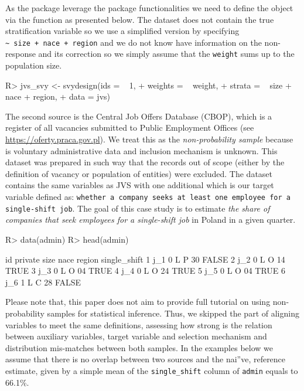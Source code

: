 \documentclass[
]{jss}
\begin{document}
As the package leverage the  package functionalities we need
to define the  object via the  function
as presented below. The dataset does not contain the true stratification
variable so we use a simplified version by specifying
\texttt{\textasciitilde{}\ size\ +\ nace\ +\ region} and we do not know
have information on the non-response and its correction so we simply
assume that the \texttt{weight} sums up to the population size.

\begin{CodeChunk}
\begin{CodeInput}
R> jvs_svy <- svydesign(ids = ~ 1, 
+                      weights = ~ weight,
+                      strata = ~ size + nace + region,
+                      data = jvs)
\end{CodeInput}
\end{CodeChunk}

The second source is the Central Job Offers Database (CBOP), which is a
register of all vacancies submitted to Public Employment Offices (see
\url{https://oferty.praca.gov.pl}). We treat this as the
\textit{non-probability sample} because is voluntary administrative data
and inclusion mechanism is unknown. This dataset was prepared in such
way that the records out of scope (either by the definition of vacancy
or population of entities) were excluded. The dataset contains the same
variables as JVS with one additional  which is our
target variable defined as:
\texttt{whether a company seeks at least one employee for a single-shift job}.
The goal of this case study is to estimate
\textit{the share of companies that seek employees for a single-shift job}
in Poland in a given quarter.

\begin{CodeChunk}
\begin{CodeInput}
R> data(admin)
R> head(admin)
\end{CodeInput}
\begin{CodeOutput}
   id private size nace region single_shift
1 j_1       0    L    P     30        FALSE
2 j_2       0    L    O     14         TRUE
3 j_3       0    L    O     04         TRUE
4 j_4       0    L    O     24         TRUE
5 j_5       0    L    O     04         TRUE
6 j_6       1    L    C     28        FALSE
\end{CodeOutput}
\end{CodeChunk}

Please note that, this paper does not aim to provide full tutorial on
using non-probability samples for statistical inference. Thus, we
skipped the part of aligning variables to meet the same definitions,
assessing how strong is the relation between auxiliary variables, target
variable and selection mechanism and distribution mis-matches between
both samples. In the examples below we assume that there is no overlap
between two sources and the nai''ve, reference estimate, given by a
simple mean of the \texttt{single\_shift} column of \texttt{admin}
equals to 66.1\%.
\end{document}
